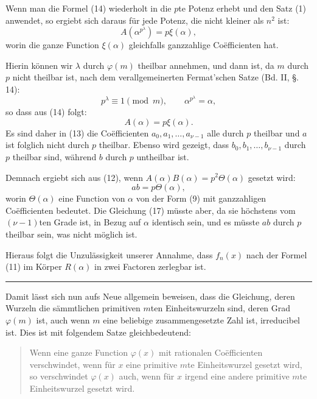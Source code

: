 \documentclass[11pt]{article}
\begin{document}
Wenn man die Formel (14) wiederholt in die $p$te Potenz erhebt und den Satz (1) anwendet, so ergiebt sich daraus für jede Potenz, die nicht kleiner als $n^2$ ist:
\begin{equation}\tag{15}
A(\alpha^{p^\lambda})=p\xi(\alpha),
\end{equation}
worin die ganze Function $\xi(\alpha)$ gleichfalls ganzzahlige Coëfficienten hat.

Hierin können wir $\lambda$ durch $\varphi(m)$ theilbar annehmen, und dann ist, da $m$ durch $p$ nicht theilbar ist, nach dem verallgemeinerten Fermat'schen Satze (Bd. II, §. 14):
\[
p^\lambda\equiv1 \pmod m,
\qquad
\alpha^{p^\lambda}=\alpha,
\]
so dass aus (14) folgt:
\begin{equation}\tag{16}
A(\alpha)=p\xi(\alpha).
\end{equation}
Es sind daher in (13) die Coëfficienten $a_0,a_1,\ldots,a_{\nu-1}$ alle durch $p$ theilbar und $a$ ist folglich nicht durch $p$ theilbar. Ebenso wird gezeigt, dass $b_0,b_1,\ldots,b_{\nu-1}$ durch $p$ theilbar sind, während $b$ durch $p$ untheilbar ist.

Demnach ergiebt sich aus (12), wenn $A(\alpha)B(\alpha)=p^2\Theta(\alpha)$ gesetzt wird:
\begin{equation}\tag{17}
ab=p\Theta(\alpha),
\end{equation}
worin $\Theta(\alpha)$ eine Function von $\alpha$ von der Form (9) mit ganzzahligen Coëfficienten bedeutet. Die Gleichung (17) müsste aber, da sie höchstens vom $(\nu-1)$ten Grade ist, in Bezug auf $\alpha$ identisch sein, und es müsste $ab$ durch $p$ theilbar sein, was nicht möglich ist.

Hieraus folgt die Unzulässigkeit unserer Annahme, dass $f_n(x)$ nach der Formel (11) im Körper $R(\alpha)$ in zwei Factoren zerlegbar ist.

\medskip\hrule\medskip

Damit lässt sich nun aufs Neue allgemein beweisen, dass die Gleichung, deren Wurzeln die sämmtlichen primitiven $m$ten Einheitswurzeln sind, deren Grad $\varphi(m)$ ist, auch wenn $m$ eine beliebige zusammengesetzte Zahl ist, irreducibel ist. Dies ist mit folgendem Satze gleichbedeutend:

\begin{quote}
Wenn eine ganze Function $\varphi(x)$ mit rationalen Coëfficienten verschwindet, wenn für $x$ eine primitive $m$te Einheitswurzel gesetzt wird, so verschwindet $\varphi(x)$ auch, wenn für $x$ irgend eine andere primitive $m$te Einheitswurzel gesetzt wird.
\end{quote}
\end{document}
